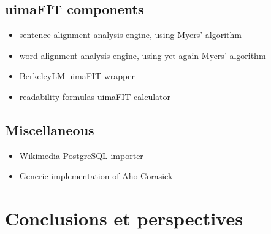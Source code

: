 \documentclass[a4paper, 11pt, onepage]{scrreprt}
\begin{document}
\section{uimaFIT components}
\label{sec:uimafit-components}

\begin{itemize}
\item sentence alignment analysis engine, using Myers' algorithm
\item word alignment analysis engine, using yet again Myers' algorithm
\item \href{https://berkeleylm.googlecode.com/}{BerkeleyLM} uimaFIT
  wrapper
\item readability formulas uimaFIT calculator
\end{itemize}

\section{Miscellaneous}
\label{sec:misc-software}
\begin{itemize}
\item Wikimedia PostgreSQL importer
\item Generic implementation of Aho-Corasick
\end{itemize}

\chapter{Conclusions  et perspectives}



\end{document}
